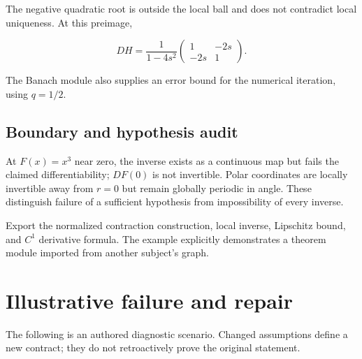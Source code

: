 \documentclass[preprint,12pt,aps,pra,showkeys,amsmath,amssymb,superscriptaddress,floatfix]{revtex4-2}
\theoremstyle{definition}
\theoremstyle{remark}
\begin{document}
The negative quadratic root is outside the local ball and does not
contradict local uniqueness. At this preimage,

\[DH=\frac1{1-4s^2}\begin{pmatrix}1&-2s\\-2s&1\end{pmatrix}.\]

The Banach module also supplies an error bound for the numerical
iteration, using \(q=1/2\).

\subsection{Boundary and hypothesis audit}

At \(F(x)=x^{3}\) near zero, the inverse exists as a continuous map but
fails the claimed differentiability; \(DF(0)\) is not invertible. Polar
coordinates are locally invertible away from \(r=0\) but remain globally
periodic in angle. These distinguish failure of a sufficient hypothesis
from impossibility of every inverse.

Export the normalized contraction construction, local inverse, Lipschitz
bound, and \(C^{1}\) derivative formula. The example explicitly
demonstrates a theorem module imported from another subject's graph.

\section{Illustrative failure and repair}

The following is an authored diagnostic scenario. Changed assumptions
define a new contract; they do not retroactively prove the original
statement.
\end{document}
